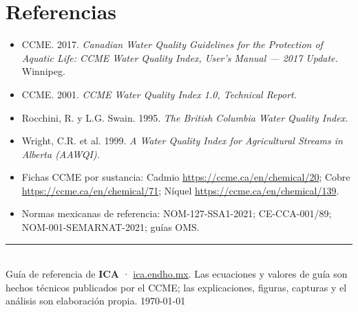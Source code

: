 \documentclass[11pt,a4paper]{article}
\begin{document}
\section{Referencias}
\begin{itemize}[leftmargin=1.4em,label={},itemindent=-1.4em,itemsep=4pt]
\item CCME. 2017. \emph{Canadian Water Quality Guidelines for the Protection of Aquatic Life: CCME Water Quality Index, User's Manual — 2017 Update.} Winnipeg.
\item CCME. 2001. \emph{CCME Water Quality Index 1.0, Technical Report.}
\item Rocchini, R. y L.G. Swain. 1995. \emph{The British Columbia Water Quality Index.}
\item Wright, C.R. et al. 1999. \emph{A Water Quality Index for Agricultural Streams in Alberta (AAWQI).}
\item Fichas CCME por sustancia: Cadmio \url{https://ccme.ca/en/chemical/20}; Cobre \url{https://ccme.ca/en/chemical/71}; Níquel \url{https://ccme.ca/en/chemical/139}.
\item Normas mexicanas de referencia: NOM-127-SSA1-2021; CE-CCA-001/89; NOM-001-SEMARNAT-2021; guías OMS.
\end{itemize}

\vfill
\begin{center}\small\color{muted}
\rule{0.4\textwidth}{0.4pt}\\[4pt]
Guía de referencia de \textbf{ICA} · \href{https://ica.endho.mx}{ica.endho.mx}. Las ecuaciones y valores
de guía son hechos técnicos publicados por el CCME; las explicaciones, figuras, capturas y el análisis
son elaboración propia. \today
\end{center}
\end{document}
